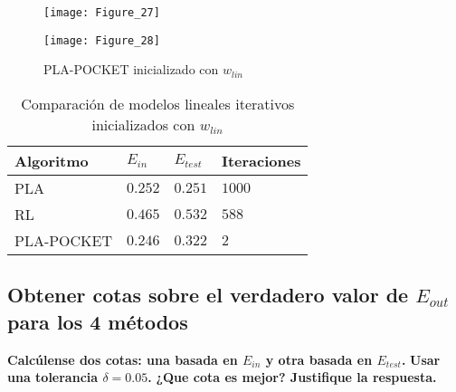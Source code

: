 \begin{figure}[H]
    \caption{PLA-POCKET inicializado con $w_{lin}$ \medskip}
    \begin{minipage}[b]{.5\linewidth}
      \centering
      \texttt{[image: Figure\_27]}
       \label{subfig-5:dummy68}
    \end{minipage}
    \hfill \hfill
    \begin{minipage}[b]{.5\linewidth}
      \centering
      \texttt{[image: Figure\_28]}
    \end{minipage}
    \label{fig:dummy68}
\end{figure}

\begin{table}[H]
    \centering
    \begin{tabular}{llll} \toprule
        Algoritmo & $E_{in}$ & $E_{test}$ & Iteraciones \\ \midrule
        PLA & $0.252$ & $0.251$ & $1000$ \\
        RL & $0.465$ & $0.532$ & $588$ \\
        PLA-POCKET & $0.246$ & $0.322$ & $2$ \\ \bottomrule
    \end{tabular}
    \caption{Comparación de modelos lineales iterativos inicializados con $w_{lin}$}
\end{table}

\subsection{Obtener cotas sobre el verdadero valor de $E_{out}$ para los 4 métodos}

\textbf{Calcúlense dos cotas: una basada en $E_{in}$ y otra basada en $E_{test}$.}
\textbf{Usar una tolerancia $\delta=0.05$.}
\textbf{¿Que cota es mejor? Justifique la respuesta.}


